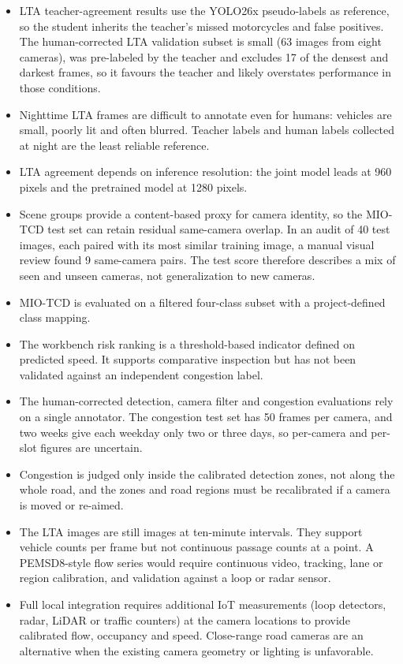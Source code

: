 \begin{itemize}
  \item LTA teacher-agreement results use the YOLO26x pseudo-labels as
        reference, so the student inherits the teacher's missed motorcycles and
        false positives. The human-corrected LTA validation subset is small (63 images from
        eight cameras), was pre-labeled by the teacher and excludes 17 of the
        densest and darkest frames, so it favours the teacher and likely
        overstates performance in those conditions.
  \item Nighttime LTA frames are difficult to annotate even for humans:
        vehicles are small, poorly lit and often blurred. Teacher labels and
        human labels collected at night are the least reliable reference.
  \item LTA agreement depends on inference resolution: the joint model leads at
        960 pixels and the pretrained model at 1280 pixels.
  \item Scene groups provide a content-based proxy for camera identity, so the
        MIO-TCD test set can retain residual same-camera overlap. In an audit of
        40 test images, each paired with its most similar training image, a
        manual visual review found 9 same-camera pairs. The test score
        therefore describes a mix of seen and unseen cameras, not generalization
        to new cameras.
  \item MIO-TCD is evaluated on a filtered four-class subset with a
        project-defined class mapping.
  \item The workbench risk ranking is a threshold-based indicator defined on
        predicted speed. It supports comparative inspection but has not been
        validated against an independent congestion label.
  \item The human-corrected detection, camera filter and congestion evaluations
        rely on a single annotator. The congestion test set has 50 frames per camera, and two
        weeks give each weekday only two or three days, so per-camera and
        per-slot figures are uncertain.
  \item Congestion is judged only inside the calibrated detection zones, not
        along the whole road, and the zones and road regions must be
        recalibrated if a camera is moved or re-aimed.
  \item The LTA images are still images at ten-minute intervals. They support
        vehicle counts per frame but not continuous passage counts at a point.
        A PEMSD8-style flow series would require continuous video, tracking,
        lane or region calibration, and validation against a loop or radar
        sensor.
  \item Full local integration requires additional IoT measurements (loop
        detectors, radar, LiDAR or traffic counters) at the camera locations to
        provide calibrated flow, occupancy and speed. Close-range road cameras
        are an alternative when the existing camera geometry or lighting is
        unfavorable.
\end{itemize}
